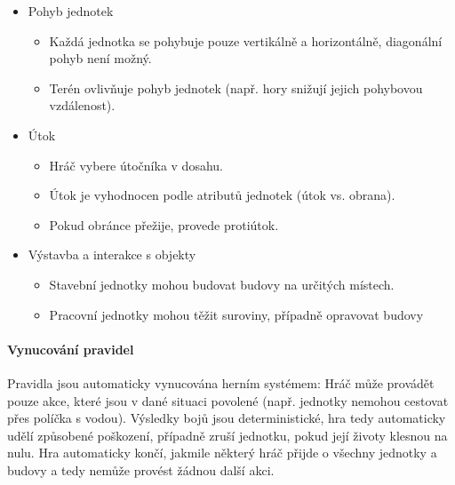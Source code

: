 \begin{itemize}
    \item Pohyb jednotek
    \begin{itemize}
        \item Každá jednotka se pohybuje pouze vertikálně a horizontálně, diagonální pohyb není možný.
        \item Terén ovlivňuje pohyb jednotek (např. hory snižují jejich pohybovou vzdálenost).
    \end{itemize}
    
    \item Útok
    \begin{itemize}
        \item Hráč vybere útočníka v dosahu.
        \item Útok je vyhodnocen podle atributů jednotek (útok vs. obrana).
        \item Pokud obránce přežije, provede protiútok.
    \end{itemize}
    
    \item Výstavba a interakce s objekty
    \begin{itemize}
        \item Stavební jednotky mohou budovat budovy na určitých místech.
        \item Pracovní jednotky mohou těžit suroviny, případně opravovat budovy
    \end{itemize}
\end{itemize}

\paragraph{Vynucování pravidel} Pravidla jsou automaticky vynucována herním systémem: Hráč může provádět pouze akce, které jsou v dané situaci povolené (např. jednotky nemohou cestovat přes políčka s vodou). Výsledky bojů jsou deterministické, hra tedy automaticky udělí způsobené poškození, případně zruší jednotku, pokud její životy klesnou na nulu. Hra automaticky končí, jakmile některý hráč přijde o všechny jednotky a budovy a tedy nemůže provést žádnou další akci.

